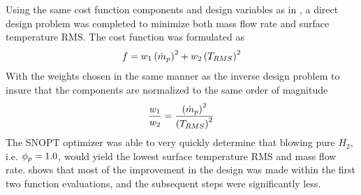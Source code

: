 Using the same cost function components and design variables as in
, a direct design problem was completed to minimize both
mass flow rate and surface temperature RMS.  The cost function was formulated as
\begin{equation}
  f = w_1\left( \dot{m}_p \right)^2 + w_2\left( T_{RMS} \right)^2
  \label{direct-design-cost-func}
\end{equation}
With the weights chosen in the same manner as the inverse design problem to
insure that the components are normalized to the same order of magnitude
\begin{equation}
  \frac{w_1}{w_2} = \frac{\left( \dot{m}_p \right)^2}{\left( T_{RMS} \right)^2}
  \label{direct-design-weights}
\end{equation}
The SNOPT optimizer was able to very quickly determine that blowing pure
$H_2$, i.e. $\phi_p = 1.0$, would yield the lowest surface temperature RMS and mass
flow rate.   shows that most of the improvement in
the design was made within the first two function evaluations, and the
subsequent steps were significantly less.
